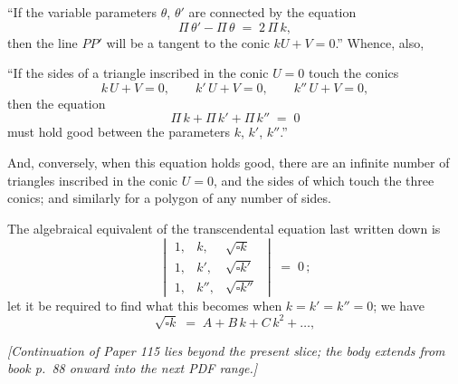 \documentclass[11pt]{article}
\begin{document}
``If the variable parameters $\theta$, $\theta'$ are connected by the equation
\[
\Pi\,\theta' - \Pi\,\theta \;=\; 2\,\Pi\,k,
\]
then the line $PP'$ will be a tangent to the conic $kU + V = 0$.''  Whence, also,

``If the sides of a triangle inscribed in the conic $U = 0$ touch the conics
\[
k\,U + V = 0,\qquad k'\,U + V = 0,\qquad k''\,U + V = 0,
\]
then the equation
\[
\Pi\,k + \Pi\,k' + \Pi\,k'' \;=\; 0
\]
must hold good between the parameters $k$, $k'$, $k''$.''

And, conversely, when this equation holds good, there are an infinite number of triangles inscribed in the conic $U = 0$, and the sides of which touch the three conics; and similarly for a polygon of any number of sides.

The algebraical equivalent of the transcendental equation last written down is
\[
\begin{vmatrix}
1, & k,   & \sqrt{\square k}\,\\
1, & k',  & \sqrt{\square k'}\,\\
1, & k'', & \sqrt{\square k''}\,
\end{vmatrix} \;=\; 0\,;
\]
let it be required to find what this becomes when $k = k' = k'' = 0$; we have
\[
\sqrt{\square k} \;=\; A + B\,k + C\,k^{2} + \ldots,
\]

\noindent\emph{[Continuation of Paper 115 lies beyond the present slice; the body extends from book p.~88 onward into the next PDF range.]}
\end{document}

